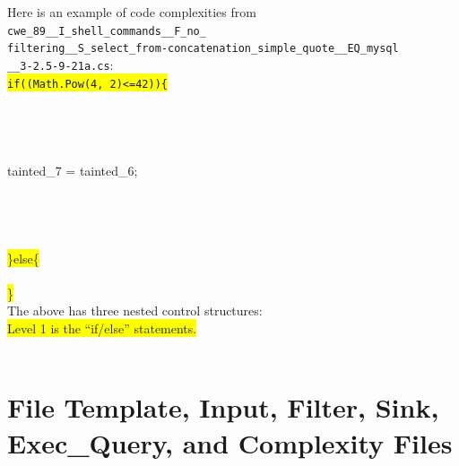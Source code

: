 Here is an example of code complexities from \verb|cwe_89__I_shell_commands__F_no_|\\
\verb|filtering__S_select_from-concatenation_simple_quote__EQ_mysql| \\
\verb|__3-2.5-9-21a.cs|: \\
{\texttt
{\colorbox{yellow}{if((Math.Pow(4, 2)<=42))\{}}\\
\\
\\
\\
\\
\hspace*{6em}tainted\_7 = tainted\_6;\\
\\
\\
\\              
\\
{\colorbox{yellow}{\}else\{}}\\
\\
{\colorbox{yellow}{\}}}
}
\\
The above has three nested control structures:\\
{\colorbox{yellow}{Level 1 is the ``if/else'' statements.}}\\
\\


\section{File Template, Input, Filter, Sink, Exec\_Query, and Complexity Files}
\label{sec:source files}

